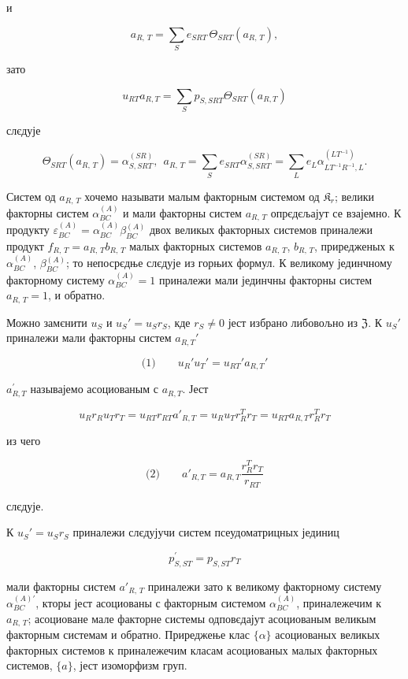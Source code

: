 \documentclass[11pt]{article}
\begin{document}
и

\[a_{R,\,T} = \sum\limits_{S} e_{SRT}\, \Theta_{SRT} \left(a_{R,\,T}\right),\]

зато

\[u_{RT} a_{R,T} = \sum\limits_{S} p_{S,SRT} \Theta_{SRT} (a_{R,T})\]

слєдује

\[\Theta_{SRT}(a_{R,\,T}) = \alpha_{S,SRT}^{(SR)}, ~~ a_{R,\,T} = \sum\limits_{S} e_{SRT} \alpha_{S,SRT}^{(SR)} = \sum\limits_{L} e_{L} \alpha_{LT^{-1}R^{-1},L}^{(LT^{-1})}.\]

Систем од \(a_{R,\,T}\) хочемо называти малым факторным системом од \(\mathfrak K_r\); велики факторны систем \(\alpha_{BC}^{(A)}\) и мали факторны систем \(a_{R,\,T}\) опрєдєљајут се взајемно. К продукту \(\varepsilon_{BC}^{(A)} = \alpha_{BC}^{(A)} \beta_{BC}^{(A)}\) двох великых факторных системов приналежи продукт \(f_{R,\,T} = a_{R,\,T}b_{R,\,T}\) малых факторных системов \(a_{R,\,T}\), \(b_{R,\,T}\), приредженых к \(\alpha_{BC}^{(A)}\), \(\beta_{BC}^{(A)}\); то непосрєдње слєдује из горњих формул. К великому јединчному факторному систему \(\alpha_{BC}^{(A)} = 1\) приналежи мали јединчны факторны систем \(a_{R,\,T} = 1\), и обратно.

Можно замєнити \(u_S\) и \(u_S'=u_Sr_S\), кде \(r_S\neq 0\) јест избрано либовољно из \(\mathfrak Z\). К \(u_S'\) приналежи мали факторны систем \(a_{R,T}'\)

\[
\text{(1)}\qquad u_R'u_T'=u_{RT}'a_{R,T}'
\]

\(a_{R,T}^{\prime}\) называјемо асоциованым с \(a_{R,T}\). Јест

\[u_R r_R u_T r_T = u_{RT} r_{RT} a'_{R,T} = u_R u_T r_R^T r_T = u_{RT} a_{R,T} r_R^T r_T\]

из чего

\[
\text{(2)}\qquad a'_{R,T}=a_{R,T}\frac{r_R^T r_T}{r_{RT}}
\]

слєдује.

К \(u_S' = u_S r_S\) приналежи слєдујучи систем псеудоматрицных јединиц

\[p_{S,ST}^{\prime}=p_{S,ST}r_{T}\]

мали факторны систем \(a'_{R,\,T}\) приналежи зато к великому факторному систему \(\alpha^{(A)\prime}_{BC}\), кторы јест асоциованы с факторным системом \(\alpha^{(A)}_{BC}\), приналежечим к \(a_{R,\,T}\); асоциоване мале факторне системы одповєдајут асоциованым великым факторным системам и обратно. Приреджење клас \(\{\alpha\}\) асоциованых великых факторных системов к приналежечим класам асоциованых малых факторных системов, \(\{a\}\), јест изоморфизм груп.
\end{document}
